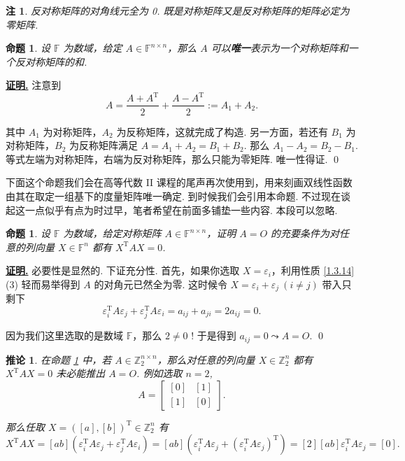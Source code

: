\documentclass[10pt,openany]{article}
\theoremstyle{thmstyle} %
\theoremstyle{defstyle} %
\newtheorem{corollary}[theorem]{推论}
\theoremstyle{prostyle} %
\newtheorem{proposition}[theorem]{命题}
\theoremstyle{exastyle}
\theoremstyle{remstyle}
\newtheorem{remark}[theorem]{注}
\renewenvironment{proof}[1][证明]{\par\underline{\textbf{#1.}} \;\fangsong}{\qed\par}
\newcommand{\T}{^{\text{T}}}
\newcommand{\F}{\mathbb{F}}
\newcommand{\n}{^{n \times n}}
\begin{document}
\begin{remark}
	反对称矩阵的对角线元全为 0. 既是对称矩阵又是反对称矩阵的矩阵必定为零矩阵.
\end{remark}

\begin{proposition}	\label{1.3.26}
	设 \( \F \) 为数域，给定 \( A \in \F^{n \times n} \)，那么 \( A \) 可以\textbf{唯一}表示为一个对称矩阵和一个反对称矩阵的和.

\end{proposition}

\begin{proof}
	注意到
	\[ A=\frac{A+A\T}{2}+\frac{A-A\T}{2}:=A_1+A_2. \]
	
	其中 \( A_1 \) 为对称矩阵，\( A_2 \) 为反称矩阵，这就完成了构造. 另一方面，若还有 \( B_1 \) 为对称矩阵，\( B_2 \) 为反称矩阵满足 \( A=A_1+A_2=B_1+B_2 \). 那么 \( A_1-A_2=B_2-B_1 \). 等式左端为对称矩阵，右端为反对称矩阵，那么只能为零矩阵. 唯一性得证.
\end{proof}



下面这个命题我们会在高等代数 II 课程的尾声再次使用到，用来刻画双线性函数由其在取定一组基下的度量矩阵唯一确定. 到时候我们会引用本命题. 不过现在谈起这一点似乎有点为时过早，笔者希望在前面多铺垫一些内容. 本段可以忽略.

\begin{proposition}	\label{1.3.27}
	设 \( \F \) 为数域，给定对称矩阵 \( A \in \F\n \)，证明 \( A=O \) 的充要条件为对任意的列向量 \( X \in \F^n\) 都有 \( X\T AX=0 \).

\end{proposition} 

\begin{proof}
	必要性是显然的. 下证充分性. 首先，如果你选取 \( X=\varepsilon_i \)，利用性质 \ref{1.3.14} (3) 轻而易举得到 \( A \) 的对角元已然全为零. 这时候令 \( X=\varepsilon_i+\varepsilon_j \ (i \neq j) \) 带入只剩下 
	\[ \varepsilon_i\T A \varepsilon_j+\varepsilon_j\T A \varepsilon_i= a_{ij}+a_{ji}=2a_{ij}=0. \]
	
	因为我们这里选取的是数域 \( \mathbb{F} \)，那么 \( 2 \neq 0 \) ! 于是得到 \( a_{ij}=0 \leadsto A=O \).
\end{proof}

\begin{corollary}
	在命题 \ref{1.3.27} 中，若 \( A \in \mathbb{Z}_2^{n \times n} \)，那么对任意的列向量 \( X \in \mathbb{Z}_2^n\) 都有 \( X\T AX=0 \) 未必能推出 \( A=O \). 例如选取 \( n=2 \),
	\[ A=\begin{bmatrix}
		[0] & [1] \\ [1] & [0]
	\end{bmatrix}. \]
	
	那么任取 \( X=([a],[b])\T \in \mathbb{Z}_2^n \) 有
	\[ X\T AX=[ab](\varepsilon_i\T A \varepsilon_j+\varepsilon_j\T A \varepsilon_i)=[ab](\varepsilon_i\T A \varepsilon_j+(\varepsilon_i\T A \varepsilon_j)\T)=[2][ab]\varepsilon_i\T A \varepsilon_j=[0]. \]
\end{corollary}
\end{document}
